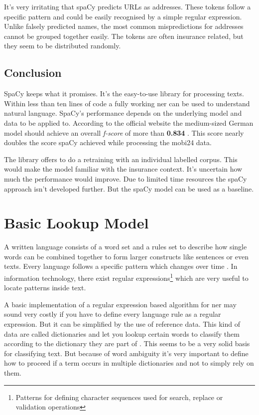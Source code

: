 It's very irritating that spaCy predicts URLs as addresses. These tokens follow a specific pattern and could be easily recognised by a simple regular expression. Unlike falsely predicted names, the most common mispredictions for addresses cannot be grouped together easily. The tokens are often insurance related, but they seem to be distributed randomly.

\subsection{Conclusion}

SpaCy keeps what it promises. It's the easy-to-use library for processing texts. Within less than ten lines of code a fully working \acrlong{ner} can be used to understand natural language. SpaCy's performance depends on the underlying model and data to be applied to. According to the official website the medium-sized German model should achieve an overall \emph{f-score} of more than \textbf{0.834} \cite{spacy}. This score nearly doubles the score spaCy achieved while processing the \gls{mobi24} data.

The library offers to do a retraining with an individual labelled corpus. This would make the model familiar with the insurance context. It's uncertain how much the performance would improve. Due to limited time resources the spaCy approach isn't developed further. But the spaCy model can be used as a baseline.

\section{Basic Lookup Model}
\label{chap:regex-model}

A written language consists of a word set and a rules set to describe how single words can be combined together to form larger constructs like sentences or even texts. Every language follows a specific pattern which changes over time \cite{wiki05}. In information technology, there exist regular expressions\footnote{Patterns for defining character sequences used for search, replace or validation operations} which are very useful to locate patterns inside text.

A basic implementation of a regular expression based algorithm for \acrlong{ner} may sound very costly if you have to define every language rule as a regular expression. But it can be simplified by the use of reference data. This kind of data are called dictionaries and let you lookup certain words to classify them according to the dictionary they are part of \cite{nurz18}. This seems to be a very solid basis for classifying text. But because of word ambiguity it's very important to define how to proceed if a term occurs in multiple dictionaries and not to simply rely on them.

